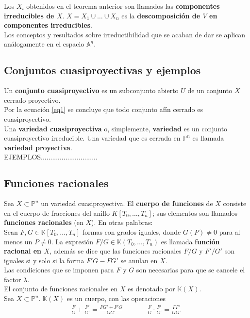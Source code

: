 \documentclass[12pt,a4paper]{report}
\newcommand{\ea}{\mathbb{A}^{n}}
\newcommand{\ep}{\mathbb{P}^{n}}
\newcommand{\K}{\mathbb{K}}
\newcommand{\ds}{\displaystyle}
\begin{document}
Los $X_{i}$ obtenidos en el teorema anterior son llamados las \textbf{componentes irreducibles de $X$}. $X= X_{1} \cup \ldots \cup X_{n} $ es la \textbf{descomposición de $V$ en componentes irreducibles}.\\
Los conceptos y resultados sobre irreductibilidad que se acaban de dar se aplican análogamente en el espacio $\ea$.\\



\subsection{Conjuntos cuasiproyectivas y ejemplos}
Un \textbf{conjunto cuasiproyectivo} es un subconjunto abierto $U$ de un conjunto $X$ cerrado proyectivo.\\
Por la ecuación \ref{eq1} se concluye que todo conjunto afín cerrado es cuasiproyectivo.\\

Una \textbf{variedad cuasiproyectiva} o, simplemente, \textbf{variedad} es un conjunto cuasiproyectivo irreducible. Una variedad que es cerrada en $\ep$ es llamada \textbf{variedad proyectiva}.\\

EJEMPLOS..............................



\subsection{Funciones racionales}
Sea $X \subset \ep$ un variedad cuasiproyectiva. El \textbf{cuerpo de funciones} de $X$ consiste en el cuerpo de fracciones del anillo $K[T_{0}, \ldots , T_{n}]$; sus elementos son llamados \textbf{funciones racionales} (en $X$). En otras palabras:\\
Sean $F, G \in \K [T_{0}, \ldots , T_{n}]$ formas con grados iguales, donde $G(P) \neq 0$ para al menos un $P \neq 0$. La expresión $F/G \in \K (T_{0}, \ldots ,T_{n} )$ es llamada \textbf{función racional en $X$}, además se dice que las funciones racionales $F/G$ y $ F'/G'$ son iguales si y solo si la forma $F'G-FG'$ se anulan en  $X$. \\
Las condiciones que se imponen para $F$ y $G$ son necesarias para que se cancele el factor $\lambda$. \\
El conjunto de funciones racionales en $X$ es denotado por $\K (X)$.\\

Sea $X \subset \ep$. $\K(X)$ es un cuerpo, con las operaciones 
$$ \begin{array}{ccc}
\ds \frac{F}{G} + \frac{F'}{G'} =\frac{FG'+F'G}{GG'} & \qquad &\ds \frac{F}{G} \cdot \frac{F'}{G'} = \frac{FF'}{GG'}
\end{array} $$
\end{document}
